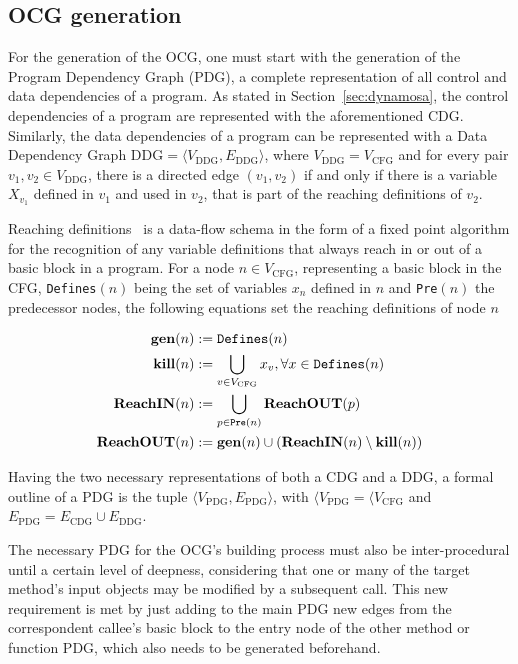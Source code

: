 \documentclass[%
  chapterprefix=false,%
  open=right,%
  twoside=true,%
  paper=a4,%
  logofile={Figures/logo.png},%
  thesistype=master,%
  UKenglish,%
]{se2thesis}
\newcommand{\callable}[1]{\texttt{#1}}
\begin{document}
\subsection{OCG generation}

For the generation of the OCG, one must start with the generation of the Program Dependency Graph (PDG), a complete representation of all control and data dependencies of a program.
As stated in Section~\ref{sec:dynamosa}, the control dependencies of a program are represented with the aforementioned CDG.\@
Similarly, the data dependencies of a program can be represented with a Data Dependency Graph \(\text{DDG} = \langle V_{\text{DDG}}, E_{\text{DDG}} \rangle\), where \(V_{\text{DDG}} = V_{\text{CFG}}\) and for every pair \(v_1, v_2 \in V_{\text{DDG}}\), there is a directed edge \((v_1, v_2)\) if and only if there is a variable \(X_{v_1}\) defined in \(v_1\) and used in \(v_2\), that is part of the reaching definitions of \(v_2\).

Reaching definitions~\cite{DBLP:books/aw/AhoSU86} is a data-flow schema in the form of a fixed point algorithm for the recognition of any variable definitions that always reach in or out of a basic block in a program.
For a node \(n \in V_{\text{CFG}}\), representing a basic block in the CFG, \callable{Defines}\((n)\) being the set of variables \(x_n\) defined in \(n\) and \callable{Pre}\((n)\) the predecessor nodes, the following equations set the reaching definitions of node \(n\)

\begin{align*}
  \text{\textbf{gen}}(n) &:= \text{\callable{Defines}}(n) \\
  \text{\textbf{kill}}(n) &:= \bigcup_{v \in V_{\text{CFG}}} x_v, \forall x \in \text{\callable{Defines}}(n) \\
  \text{\textbf{ReachIN}}(n) &:= \bigcup_{p \in \text{\callable{Pre}}(n)} \text{\textbf{ReachOUT}}(p) \\
  \text{\textbf{ReachOUT}}(n) &:= \text{\textbf{gen}}(n) \cup (\text{\textbf{ReachIN}}(n) \setminus \text{\textbf{kill}}(n))\\
\end{align*}

Having the two necessary representations of both a CDG and a DDG, a formal outline of a PDG is the tuple \(\langle V_{\text{PDG}}, E_{\text{PDG}} \rangle\), with \(\langle V_{\text{PDG}} = \langle V_{\text{CFG}}\) and \(E_{\text{PDG}} = E_{\text{CDG}} \cup E_{\text{DDG}}\).

The necessary PDG for the OCG's building process must also be inter-procedural until a certain level of deepness, considering that one or many of the target method's input objects may be modified by a subsequent call.
This new requirement is met by just adding to the main PDG new edges from the correspondent callee's basic block to the entry node of the other method or function PDG, which also needs to be generated beforehand.
\end{document}
